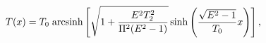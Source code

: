 \begin{equation}\label{eki}
T(x) = T_0 \;{\rm arcsinh} \left[
           \sqrt{1+\frac{E^{2}T_{2}^{2}}{\Pi^{2}(E^2-1)}}
	   \sinh\left(\frac{\sqrt{E^2-1}}{T_0} x \right) \right],
\end{equation} 
